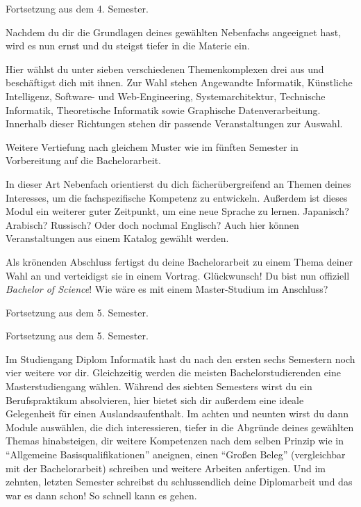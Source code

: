 Fortsetzung aus dem 4. Semester.

Nachdem du dir die Grundlagen deines gewählten Nebenfachs angeeignet hast, wird es nun ernst und du steigst tiefer in die Materie ein.

Hier wählst du unter sieben verschiedenen Themenkomplexen drei aus und beschäftigst dich mit ihnen.
Zur Wahl stehen Angewandte Informatik, Künstliche Intelligenz, Software- und Web-Engineering, Systemarchitektur, Technische Informatik, Theoretische Informatik sowie Graphische Datenverarbeitung.
Innerhalb dieser Richtungen stehen dir passende Veranstaltungen zur Auswahl.


Weitere Vertiefung nach gleichem Muster wie im fünften Semester in Vorbereitung auf die Bachelorarbeit.

\label{lec:aqua}
In dieser Art Nebenfach orientierst du dich fächerübergreifend an Themen deines Interesses, um die fachspezifische Kompetenz zu entwickeln.
Außerdem ist dieses Modul ein weiterer guter Zeitpunkt, um eine neue Sprache zu lernen. Japanisch? Arabisch? Russisch? Oder doch nochmal Englisch?
Auch hier können Veranstaltungen aus einem Katalog gewählt werden.

\newpage

Als krönenden Abschluss fertigst du deine Bachelorarbeit zu einem Thema deiner Wahl an und verteidigst sie in einem Vortrag.
Glückwunsch! Du bist nun offiziell \textit{Bachelor of Science}! Wie wäre es mit einem Master-Studium im Anschluss?

Fortsetzung aus dem 5. Semester.

Fortsetzung aus dem 5. Semester.


Im Studiengang Diplom Informatik hast du nach den ersten sechs Semestern noch vier weitere vor dir. Gleichzeitig werden die meisten Bachelorstudierenden eine Masterstudiengang wählen.
Während des siebten Semesters wirst du ein Berufspraktikum absolvieren, hier bietet sich dir außerdem eine ideale Gelegenheit für einen Auslandsaufenthalt.
Im achten und neunten wirst du dann Module auswählen, die dich interessieren, tiefer in die Abgründe deines gewählten Themas hinabsteigen, dir weitere Kompetenzen nach dem selben Prinzip wie in \enquote{Allgemeine Basisqualifikationen} aneignen, einen \enquote{Großen Beleg} (vergleichbar mit der Bachelorarbeit) schreiben und weitere Arbeiten anfertigen.
Und im zehnten, letzten Semester schreibst du schlussendlich deine Diplomarbeit und das war es dann schon!
So schnell kann es gehen.

